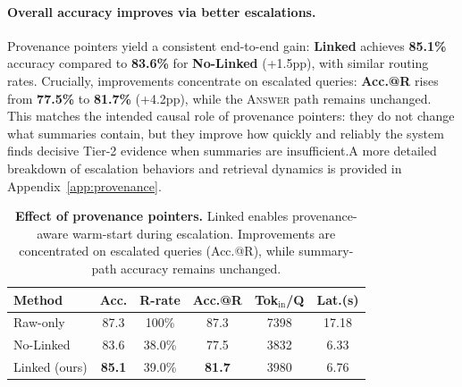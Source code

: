 \documentclass{article}
\theoremstyle{plain}
\theoremstyle{definition}
\theoremstyle{remark}
\begin{document}
\paragraph{Overall accuracy improves via better escalations.}
Provenance pointers yield a consistent end-to-end gain: \textbf{Linked} achieves \textbf{85.1\%} accuracy compared to \textbf{83.6\%} for \textbf{No-Linked} (+1.5pp), with similar routing rates.
Crucially, improvements concentrate on escalated queries: \textbf{Acc.@R} rises from \textbf{77.5\%} to \textbf{81.7\%} (+4.2pp), while the \textsc{Answer} path remains unchanged.
This matches the intended causal role of provenance pointers: they do not change what summaries contain, but they improve how quickly and reliably the system finds decisive Tier-2 evidence when summaries are insufficient.A more detailed breakdown of escalation behaviors and retrieval dynamics is provided in Appendix~\ref{app:provenance}.



\begin{table}[t]
\centering
\small
\setlength{\tabcolsep}{4pt}

\caption{
\textbf{Effect of provenance pointers.}
Linked enables provenance-aware warm-start during escalation.
Improvements are concentrated on escalated queries (Acc.@R), while summary-path accuracy remains unchanged.
}
\begin{tabular}{lccccc}
\toprule
\textbf{Method} &
\textbf{Acc.} &
\textbf{R-rate} &
\textbf{Acc.@R} &
\textbf{Tok$_{\text{in}}$/Q} &
\textbf{Lat.(s)} 
\\
\midrule
Raw-only & 87.3 & 100\% & 87.3 & 7398 & 17.18 \\
\midrule
No-Linked & 83.6 & 38.0\% & 77.5 & 3832 & 6.33\\
Linked (ours) & \textbf{85.1} & 39.0\% & \textbf{81.7} & 3980 & 6.76 \\
\bottomrule
\end{tabular}

\label{tab:provenance_main}
\end{table}
\end{document}
